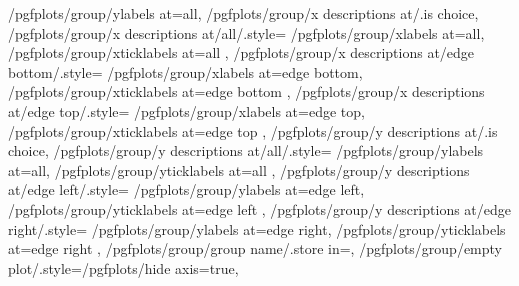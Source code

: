 {    /pgfplots/group/ylabels at=all,
    /pgfplots/group/x descriptions at/.is choice,
    /pgfplots/group/x descriptions at/all/.style={
        /pgfplots/group/xlabels at=all,
        /pgfplots/group/xticklabels at=all
    },
    /pgfplots/group/x descriptions at/edge bottom/.style={
        /pgfplots/group/xlabels at=edge bottom,
        /pgfplots/group/xticklabels at=edge bottom
    },
    /pgfplots/group/x descriptions at/edge top/.style={
        /pgfplots/group/xlabels at=edge top,
        /pgfplots/group/xticklabels at=edge top
    },
    /pgfplots/group/y descriptions at/.is choice,
    /pgfplots/group/y descriptions at/all/.style={
        /pgfplots/group/ylabels at=all,
        /pgfplots/group/yticklabels at=all
    },
    /pgfplots/group/y descriptions at/edge left/.style={
        /pgfplots/group/ylabels at=edge left,
        /pgfplots/group/yticklabels at=edge left
    },
    /pgfplots/group/y descriptions at/edge right/.style={
        /pgfplots/group/ylabels at=edge right,
	/pgfplots/group/yticklabels at=edge right
    },
    /pgfplots/group/group name/.store in=\pgfplots@group@name,
    /pgfplots/group/empty plot/.style={/pgfplots/hide axis=true},
}

\def\nextgroupplot{%
    \pgfutil@ifnextchar[{\pgfplots@group@nextplot}{\pgfplots@group@nextplot[]}%
}

